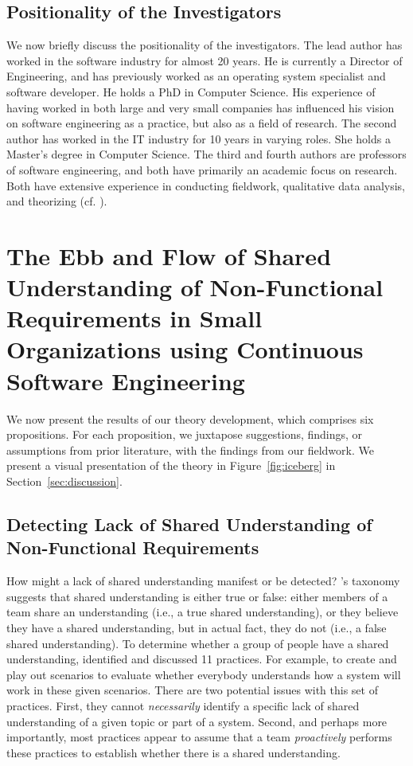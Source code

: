 \documentclass[smallextended]{svjour3}       %
\begin{document}
\subsection{Positionality of the Investigators}
We now briefly discuss the positionality of the investigators. 
The lead author has worked in the software industry for almost 20 years. He is currently a Director of Engineering, and has previously worked as an operating system specialist and software developer. He holds a PhD in Computer Science. His experience of having worked in both large and very small companies has influenced his vision on software engineering as a practice, but also as a field of research. The second author has worked in the IT industry for 10 years in varying roles. She holds a Master's degree in Computer Science. 
The third and fourth authors are professors of software engineering, and both have primarily an academic focus on research. Both have extensive experience in conducting fieldwork, qualitative data analysis, and theorizing (cf. \citep{damian2002impact,stol2014key}). 

\section{The Ebb and Flow of Shared Understanding of Non-Functional Requirements in Small Organizations using Continuous Software Engineering}
\label{theory_overview}

We now present the results of our theory development, which comprises six propositions. For each proposition, we juxtapose suggestions, findings, or assumptions from prior literature, with the findings from our fieldwork. 
We present a visual presentation of the theory in Figure~\ref{fig:iceberg} in Section~\ref{sec:discussion}.


\subsection{Detecting Lack of Shared Understanding of Non-Functional Requirements}

How might a lack of shared understanding manifest or be detected?
\cite{glinz_shared_2015}'s taxonomy suggests that shared understanding is either true or false: either members of a team share an understanding (i.e., a true shared understanding), or they believe they have a shared understanding, but in actual fact, they do not (i.e., a false shared understanding). 
To determine whether a group of people have a shared understanding, \cite{glinz_shared_2015} identified and discussed 11 practices. For example, to create and play out scenarios to evaluate whether everybody understands how a system will work in these given scenarios. 
There are two potential issues with this set of practices. First, they cannot \textit{necessarily} identify a \textmd{specific} lack of shared understanding of a given topic or part of a system. Second, and perhaps more importantly, most practices appear to assume that a team \textit{proactively} performs these practices to establish whether there is a shared understanding. 
\end{document}
